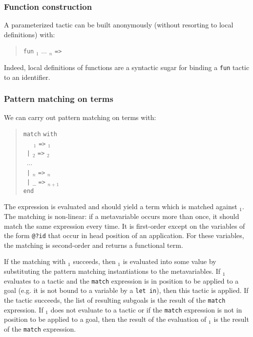 
\subsubsection[Function construction]{Function construction
}

A parameterized tactic can be built anonymously (without resorting to
local definitions) with:
\begin{quote}
{\tt fun} {\ident${}_1$} ... {\ident${}_n$} {\tt =>} {\tacexpr}
\end{quote}
Indeed, local definitions of functions are a syntactic sugar for
binding a {\tt fun} tactic to an identifier.

\subsubsection[Pattern matching on terms]{Pattern matching on terms
}

We can carry out pattern matching on terms with:
\begin{quote}
{\tt match} {\tacexpr} {\tt with}\\
~~~{\cpattern}$_1$ {\tt =>} {\tacexpr}$_1$\\
~{\tt |} {\cpattern}$_2$ {\tt =>} {\tacexpr}$_2$\\
~...\\
~{\tt |} {\cpattern}$_n$ {\tt =>} {\tacexpr}$_n$\\
~{\tt |} {\tt \_} {\tt =>} {\tacexpr}$_{n+1}$\\
{\tt end}
\end{quote}
The expression {\tacexpr} is evaluated and should yield a term which
is matched against {\cpattern}$_1$. The matching is non-linear: if a
metavariable occurs more than once, it should match the same
expression every time. It is first-order except on the
variables of the form {\tt @?id} that occur in head position of an
application. For these variables, the matching is second-order and
returns a functional term.

If the matching with {\cpattern}$_1$ succeeds, then {\tacexpr}$_1$ is
evaluated into some value by substituting the pattern matching
instantiations to the metavariables. If {\tacexpr}$_1$ evaluates to a
tactic and the {\tt match} expression is in position to be applied to
a goal (e.g. it is not bound to a variable by a {\tt let in}), then
this tactic is applied. If the tactic succeeds, the list of resulting
subgoals is the result of the {\tt match} expression. If
{\tacexpr}$_1$ does not evaluate to a tactic or if the {\tt match}
expression is not in position to be applied to a goal, then the result
of the evaluation of {\tacexpr}$_1$ is the result of the {\tt match}
expression.

